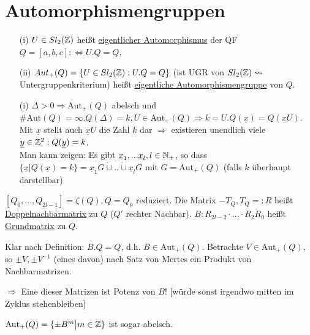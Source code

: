 \documentclass[a4paper,twoside,DIV15,BCOR12mm]{scrbook}
\begin{document}
\section{Automorphismengruppen}

\begin{definition}
\begin{itemize}
\item[(i)] $U \in Sl_2(\mathbb{Z})$ heißt \underline{eigentlicher Automorphismus} der QF $Q = [a,b,c] :\Leftrightarrow U.Q = Q$.
\item[(ii)] $Aut_+(Q) = \{U \in Sl_2(\mathbb{Z}): U.Q = Q\}$ (ist UGR von $Sl_2(\mathbb{Z}) \leadsto$ Untergruppenkriterium) heißt \underline{eigentliche Automorphismengruppe} von $Q$.
\end{itemize}
\end{definition}

\begin{beweis}
\begin{itemize}
\item[(i)] $\Delta > 0 \Rightarrow \text{Aut}_+(Q)$ abelsch und $\#\text{Aut}(Q) = \infty. Q(\Delta) = k, U \in \text{Aut}_+(Q) \Rightarrow k = U.Q(\underline x) = Q(\underline xU)$. Mit $\underline x$ stellt auch $\underline xU$ die Zahl $k$ dar $\Rightarrow$ existieren unendlich viele $\underline y \in \mathbb{Z}^2: Q(\underline y) = k$.\\
Man kann zeigen: Es gibt $\underline x_1, ... \underline x_l, l \in \mathbb{N}_+$, so dass $\{\underline x \big| Q(\underline x) = k\} = \underline x_1G \dot \cup .. \dot \cup \underline x_lG$ mit $G = \text{Aut}_+(Q)$ (falls $k$ überhaupt darstellbar)
\end{itemize}
\end{beweis}

\begin{definition}
$[Q_0, ..., Q_{2l-1}] = \zeta(Q), Q = Q_0$ reduziert. Die Matrix $-T_Q, T_Q =: R$ heißt \underline{Doppelnachbarmatrix} zu $Q$ ($Q'$ rechter Nachbar). $B: R_{2l-2} \cdot ... \cdot R_2 \dot R_0$ heißt \underline{Grundmatrix} zu $Q$.
\end{definition}

Klar nach Definition: $B.Q = Q$, d.h. $B \in \text{Aut}_+(Q)$. Betrachte $V \in \text{Aut}_+(Q)$, so $\pm V, \pm V^{-1}$ (eines davon) nach Satz von Mertes ein Produkt von Nachbarmatrizen.

$\Rightarrow$ Eine dieser Matrizen ist Potenz von $B$! [würde sonst irgendwo mitten im Zyklus stehenbleiben]

\begin{satz}
$\text{Aut}_+(Q) = \{\pm B^m \big| m \in \mathbb{Z}\}$ ist sogar abelsch.
\end{satz}
\end{document}
